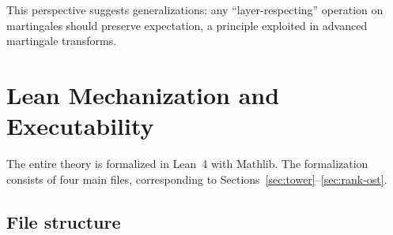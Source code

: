 \documentclass[11pt]{article}
\theoremstyle{definition}
\theoremstyle{remark}
\begin{document}
This perspective suggests generalizations: any ``layer-respecting'' operation on martingales should preserve expectation, a principle exploited in advanced martingale transforms.

\section{Lean Mechanization and Executability}
\label{sec:lean}

The entire theory is formalized in Lean~4 with Mathlib.
The formalization consists of four main files, corresponding to Sections~\ref{sec:tower}--\ref{sec:rank-ost}.

\subsection{File structure}
\end{document}
